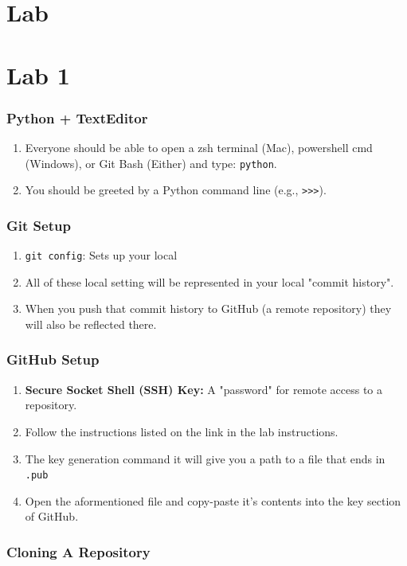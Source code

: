 \documentclass{beamer}
\begin{document}
\section{Lab}


\section{Lab 1}

\begin{frame}
  \frametitle{Python + TextEditor}
  \begin{enumerate}
    \item Everyone should be able to open a zsh terminal (Mac), powershell cmd (Windows), or Git Bash (Either) and type: \lstinline|python|.
    \item You should be greeted by a Python command line (e.g., \lstinline|>>>|).
  \end{enumerate}
\end{frame}

\begin{frame}
  \frametitle{Git Setup}
  \begin{enumerate}
    \item \lstinline|git config|: Sets up your local 
    \item All of these local setting will be represented in your local "commit history".
    \item When you push that commit history to GitHub (a remote repository) they will also be reflected there.
  \end{enumerate}
\end{frame}

\begin{frame}
  \frametitle{GitHub Setup}
  \begin{enumerate}
    \item \textbf{Secure Socket Shell (SSH) Key: } A "password" for remote access to a repository.
    \item Follow the instructions listed on the link in the lab instructions.
    \item The key generation command it will give you a path to a file that ends in \lstinline|.pub|
    \item Open the aformentioned file and copy-paste it's contents into the key section of GitHub.
  \end{enumerate}
\end{frame}

\begin{frame}
  \frametitle{Cloning A Repository}
\end{frame}
\end{document}
